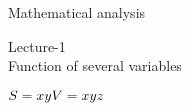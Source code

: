 \documentclass[a4paper]{beamer}
\begin{document}

    \begin{center}
        \LARGE Mathematical analysis
    \end{center}
    \newpage
    \begin{center}
        \LARGE Lecture-1\\
        \LARGE Function of several variables\\
    \end{center}
    $S=xy \\
    V=xyz$\\
\end{document}
